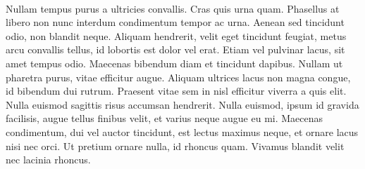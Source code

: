 \paragraph{} Nullam tempus purus a ultricies convallis. Cras quis urna quam. Phasellus at libero non nunc interdum condimentum tempor ac urna. Aenean sed tincidunt odio, non blandit neque. Aliquam hendrerit, velit eget tincidunt feugiat, metus arcu convallis tellus, id lobortis est dolor vel erat. Etiam vel pulvinar lacus, sit amet tempus odio. Maecenas bibendum diam et tincidunt dapibus. Nullam ut pharetra purus, vitae efficitur augue. Aliquam ultrices lacus non magna congue, id bibendum dui rutrum. Praesent vitae sem in nisl efficitur viverra a quis elit. Nulla euismod sagittis risus accumsan hendrerit. Nulla euismod, ipsum id gravida facilisis, augue tellus finibus velit, et varius neque augue eu mi. Maecenas condimentum, dui vel auctor tincidunt, est lectus maximus neque, et ornare lacus nisi nec orci. Ut pretium ornare nulla, id rhoncus quam. Vivamus blandit velit nec lacinia rhoncus.
